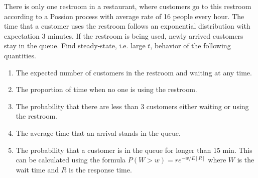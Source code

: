 \item There is only one restroom in a restaurant, where customers go to this
    restroom according to a
    Possion process with average rate of 16 people every hour. The time that a
    customer uses the restroom follows an exponential distribution with expectation
    3 minutes. If the restroom is being used, newly arrived customers stay in the queue.
    Find steady-state, i.e. large $t$, behavior of the following quantities.
    \begin{enumerate}
      \item The expected number of customers in the restroom and waiting at any time.
      \item The proportion of time when no one is using the restroom.
      \item The probability that there are less than 3 customers either waiting
        or using the restroom.
      \item The average time that an arrival stands in the queue.
      \item The probability that a customer is in the queue for longer than 15 
      min. This can be calculated using the formula $P(W > w) = re^{-w/E[R]}$ 
      where $W$ is the wait time and $R$ is the response time.
    \end{enumerate}
